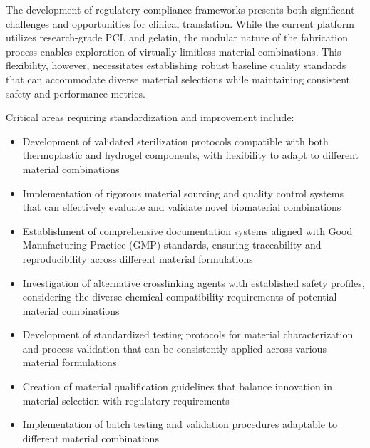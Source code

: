 The development of regulatory compliance frameworks presents both significant challenges and opportunities for clinical translation. While the current platform utilizes research-grade PCL and gelatin, the modular nature of the fabrication process enables exploration of virtually limitless material combinations. This flexibility, however, necessitates establishing robust baseline quality standards that can accommodate diverse material selections while maintaining consistent safety and performance metrics.

Critical areas requiring standardization and improvement include:
\begin{itemize}
    \item Development of validated sterilization protocols compatible with both thermoplastic and hydrogel components, with flexibility to adapt to different material combinations
    
    \item Implementation of rigorous material sourcing and quality control systems that can effectively evaluate and validate novel biomaterial combinations
    
    \item Establishment of comprehensive documentation systems aligned with Good Manufacturing Practice (GMP) standards, ensuring traceability and reproducibility across different material formulations
    
    \item Investigation of alternative crosslinking agents with established safety profiles, considering the diverse chemical compatibility requirements of potential material combinations
    
    \item Development of standardized testing protocols for material characterization and process validation that can be consistently applied across various material formulations
    
    \item Creation of material qualification guidelines that balance innovation in material selection with regulatory requirements
    
    \item Implementation of batch testing and validation procedures adaptable to different material combinations
\end{itemize}

